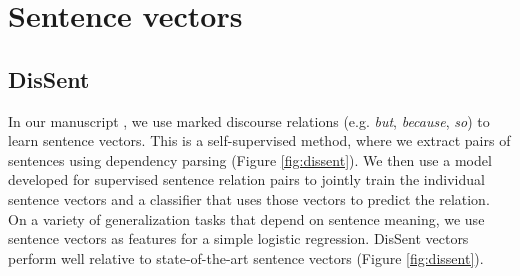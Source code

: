 \documentclass{article}
\newcommand{\w}[1]{\emph{#1}}
\newcommand{\s}[1]{``#1''}
\begin{document}




   

   \section{Sentence vectors}

   \subsection{DisSent}

   In our manuscript \cite{NieBennettGoodman17}, we use marked discourse relations (e.g. \w{but}, \w{because}, \w{so}) to learn sentence vectors.
   This is a self-supervised method, where we extract pairs of sentences using dependency parsing (Figure \ref{fig:dissent}).
   We then use a model developed for supervised sentence relation pairs \cite{conneau2017supervised} to jointly train the individual sentence vectors and a classifier that uses those vectors to predict the relation.
   On a variety of generalization tasks that depend on sentence meaning, we use sentence vectors as features for a simple logistic regression.
   DisSent vectors perform well relative to state-of-the-art sentence vectors (Figure \ref{fig:dissent}).

\end{document}
